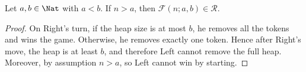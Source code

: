 \documentclass[oneside,reqno]{amsart}
\newcommand{\fs}{\mathcal{F}}
\newcommand{\rp}{\mathscr{R}}
\begin{document}
\begin{proposition}\label{prop: stronger wins}
    Let $a,b\in \Nat$ with $a<b$. If $n>a$, then $\fs(n;a,b)\in \rp$. 
\end{proposition}
\begin{proof}
    

    On Right's turn, if the heap size is at most \(b\), he removes all the tokens and wins the game. Otherwise, he removes exactly one token. Hence after Right's move, the heap is at least $b$, and therefore Left cannot remove the full heap. Moreover, by assumption $n>a$, so Left cannot win by starting. 
\end{proof}
\end{document}
